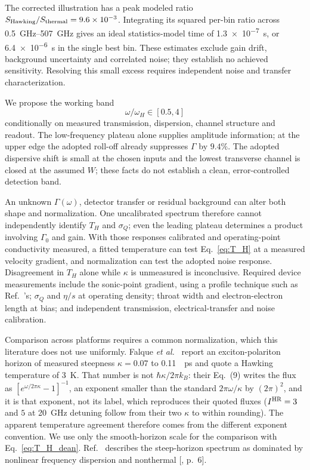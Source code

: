 \documentclass[aps,prl,twocolumn,superscriptaddress,nofootinbib]{revtex4-2}
\begin{document}
The corrected illustration has a peak modeled ratio
$S_{\rm Hawking}/S_{\rm thermal}=9.6\times10^{-3}$.
Integrating its squared per-bin ratio across
\SIrange{0.5}{507}{\giga\hertz} gives an ideal statistics-model time of
\SI{1.3e-7}{\second}, or \SI{6.4e-6}{\second} in the single best bin.
These estimates exclude gain drift, background uncertainty and correlated
noise; they establish no achieved sensitivity. Resolving this small
excess requires independent noise and transfer characterization.

We propose the working band
\begin{equation}
\boxed{\;\omega/\omega_H \in [0.5, 4]\;}
\label{eq:falsifiable_window}
\end{equation}
conditionally on measured transmission, dispersion, channel structure and
readout. The low-frequency plateau alone supplies amplitude information;
at the upper edge the adopted roll-off already suppresses $\Gamma$ by
$9.4\%$. The adopted dispersive shift is small at the chosen inputs and
the lowest transverse channel is closed at the assumed $W$; these facts
do not establish a clean, error-controlled detection band.

An unknown $\Gamma(\omega)$, detector transfer or residual background can
alter both shape and normalization. One uncalibrated spectrum therefore
cannot independently identify $T_H$ and $\sigma_Q$; even the leading
plateau determines a product involving $\Gamma_0$ and gain.
With those responses calibrated and operating-point conductivity measured,
a fitted temperature can test Eq.~\eqref{eq:T_H} at a measured velocity
gradient, and normalization can test the adopted noise response.
Disagreement in $T_H$ alone while $\kappa$ is unmeasured is inconclusive.
Required device measurements include the sonic-point gradient, using a
profile technique such as Ref.~\cite{Geurs2025}'s; $\sigma_Q$ and $\eta/s$
at operating density; throat width and electron-electron length at bias;
and independent transmission, electrical-transfer and noise calibration.

Comparison across platforms requires a common normalization, which this
literature does not use uniformly. Falque \emph{et al.}~\cite{Falque2025}
report an exciton-polariton horizon of measured steepness $\kappa = 0.07$
to \SI{0.11}{\per\pico\second} and quote a Hawking temperature of
\SI{3}{\kelvin}. That number is not $\hbar\kappa/2\pi k_B$: their Eq.~(9)
writes the flux as $[e^{\omega/2\pi\kappa}-1]^{-1}$, an exponent smaller
than the standard $2\pi\omega/\kappa$ by $(2\pi)^2$, and it is that
exponent, not its label, which reproduces their quoted fluxes
($I^{\rm HR} = 3$ and $5$ at \SI{20}{\giga\hertz} detuning follow from
their two $\kappa$ to within rounding). The apparent temperature
agreement therefore comes from the different exponent convention.
We use only the smooth-horizon scale for the comparison with
Eq.~\eqref{eq:T_H_dean}. Ref.~\cite{Falque2025} describes the
steep-horizon spectrum as dominated by nonlinear frequency dispersion
and nonthermal [, p.~6].
\end{document}
